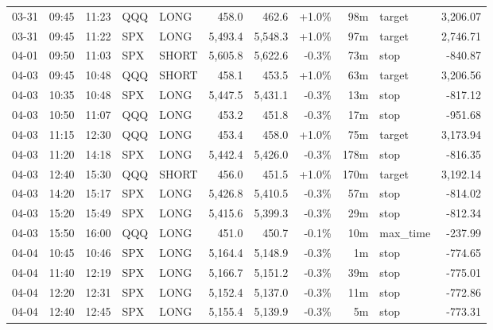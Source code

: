 \documentclass[11pt,a4paper,twoside]{article}
\begin{document}
\begin{center}
\begin{longtable}{>{\color{txtmain}}l l l l l r r r r >{\color{txtmain}}l r}
03-31 & 09:45 & 11:23 & QQQ & LONG & 458.0 & 462.6 & \textcolor{wingreen}{+1.0\%} & 98m & target & \textcolor{wingreen}{3,206.07} \\
03-31 & 09:45 & 11:22 & SPX & LONG & 5,493.4 & 5,548.3 & \textcolor{wingreen}{+1.0\%} & 97m & target & \textcolor{wingreen}{2,746.71} \\
04-01 & 09:50 & 11:03 & SPX & SHORT & 5,605.8 & 5,622.6 & \textcolor{lossred}{-0.3\%} & 73m & stop & \textcolor{lossred}{-840.87} \\
04-03 & 09:45 & 10:48 & QQQ & SHORT & 458.1 & 453.5 & \textcolor{wingreen}{+1.0\%} & 63m & target & \textcolor{wingreen}{3,206.56} \\
04-03 & 10:35 & 10:48 & SPX & LONG & 5,447.5 & 5,431.1 & \textcolor{lossred}{-0.3\%} & 13m & stop & \textcolor{lossred}{-817.12} \\
04-03 & 10:50 & 11:07 & QQQ & LONG & 453.2 & 451.8 & \textcolor{lossred}{-0.3\%} & 17m & stop & \textcolor{lossred}{-951.68} \\
04-03 & 11:15 & 12:30 & QQQ & LONG & 453.4 & 458.0 & \textcolor{wingreen}{+1.0\%} & 75m & target & \textcolor{wingreen}{3,173.94} \\
04-03 & 11:20 & 14:18 & SPX & LONG & 5,442.4 & 5,426.0 & \textcolor{lossred}{-0.3\%} & 178m & stop & \textcolor{lossred}{-816.35} \\
04-03 & 12:40 & 15:30 & QQQ & SHORT & 456.0 & 451.5 & \textcolor{wingreen}{+1.0\%} & 170m & target & \textcolor{wingreen}{3,192.14} \\
04-03 & 14:20 & 15:17 & SPX & LONG & 5,426.8 & 5,410.5 & \textcolor{lossred}{-0.3\%} & 57m & stop & \textcolor{lossred}{-814.02} \\
04-03 & 15:20 & 15:49 & SPX & LONG & 5,415.6 & 5,399.3 & \textcolor{lossred}{-0.3\%} & 29m & stop & \textcolor{lossred}{-812.34} \\
04-03 & 15:50 & 16:00 & QQQ & LONG & 451.0 & 450.7 & \textcolor{lossred}{-0.1\%} & 10m & max\_time & \textcolor{lossred}{-237.99} \\
04-04 & 10:45 & 10:46 & SPX & LONG & 5,164.4 & 5,148.9 & \textcolor{lossred}{-0.3\%} & 1m & stop & \textcolor{lossred}{-774.65} \\
04-04 & 11:40 & 12:19 & SPX & LONG & 5,166.7 & 5,151.2 & \textcolor{lossred}{-0.3\%} & 39m & stop & \textcolor{lossred}{-775.01} \\
04-04 & 12:20 & 12:31 & SPX & LONG & 5,152.4 & 5,137.0 & \textcolor{lossred}{-0.3\%} & 11m & stop & \textcolor{lossred}{-772.86} \\
04-04 & 12:40 & 12:45 & SPX & LONG & 5,155.4 & 5,139.9 & \textcolor{lossred}{-0.3\%} & 5m & stop & \textcolor{lossred}{-773.31} \\

\end{longtable}
\end{center}
\end{document}
